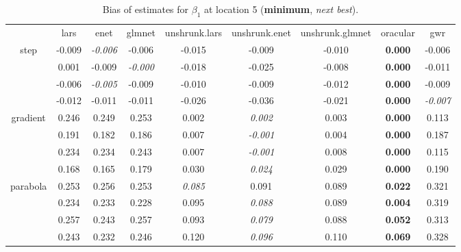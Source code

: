 \documentclass[authoryear, review, 11pt]{elsarticle}
\begin{document}
\begin{table}[ht]
\begin{center}
\begin{tabular}{ccccccccc}
  & lars & enet & glmnet & unshrunk.lars & unshrunk.enet & unshrunk.glmnet & oracular & gwr \\ 
  \cline{2-9}
  \multirow{4}{*}{step} & -0.009 & \emph{-0.006} & -0.006 & -0.015 & -0.009 & -0.010 & \textbf{0.000} & -0.006 \\ 
  & 0.001 & -0.009 & \emph{-0.000} & -0.018 & -0.025 & -0.008 & \textbf{0.000} & -0.011 \\ 
  & -0.006 & \emph{-0.005} & -0.009 & -0.010 & -0.009 & -0.012 & \textbf{0.000} & -0.009 \\ 
  & -0.012 & -0.011 & -0.011 & -0.026 & -0.036 & -0.021 & \textbf{0.000} & \emph{-0.007} \\ 
  \cline{2-9}
  \multirow{4}{*}{gradient} & 0.246 & 0.249 & 0.253 & 0.002 & \emph{0.002} & 0.003 & \textbf{0.000} & 0.113 \\ 
  & 0.191 & 0.182 & 0.186 & 0.007 & \emph{-0.001} & 0.004 & \textbf{0.000} & 0.187 \\ 
  & 0.234 & 0.234 & 0.243 & 0.007 & \emph{-0.001} & 0.008 & \textbf{0.000} & 0.115 \\ 
  & 0.168 & 0.165 & 0.179 & 0.030 & \emph{0.024} & 0.029 & \textbf{0.000} & 0.190 \\ 
  \cline{2-9}
  \multirow{4}{*}{parabola} & 0.253 & 0.256 & 0.253 & \emph{0.085} & 0.091 & 0.089 & \textbf{0.022} & 0.321 \\ 
  & 0.234 & 0.233 & 0.228 & 0.095 & \emph{0.088} & 0.089 & \textbf{0.004} & 0.319 \\ 
  & 0.257 & 0.243 & 0.257 & 0.093 & \emph{0.079} & 0.088 & \textbf{0.052} & 0.313 \\ 
  & 0.243 & 0.232 & 0.246 & 0.120 & \emph{0.096} & 0.110 & \textbf{0.069} & 0.328 \\ 
  \end{tabular}
\caption{Bias of estimates for $\beta_1$ at location 5 (\textbf{minimum}, \emph{next best}).\label{table:loc5-X1-BiasX}}
\end{center}
\end{table}
\end{document}
